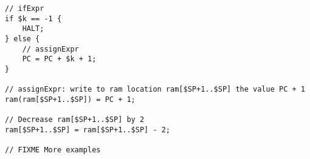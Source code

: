 \lstset{caption=Example expressions}
\begin{lstlisting}
// ifExpr
if $k == -1 {
	HALT;
} else {
	// assignExpr
	PC = PC + $k + 1;
}

// assignExpr: write to ram location ram[$SP+1..$SP] the value PC + 1
ram(ram[$SP+1..$SP]) = PC + 1;

// Decrease ram[$SP+1..$SP] by 2
ram[$SP+1..$SP] = ram[$SP+1..$SP] - 2;

// FIXME More examples
\end{lstlisting}
